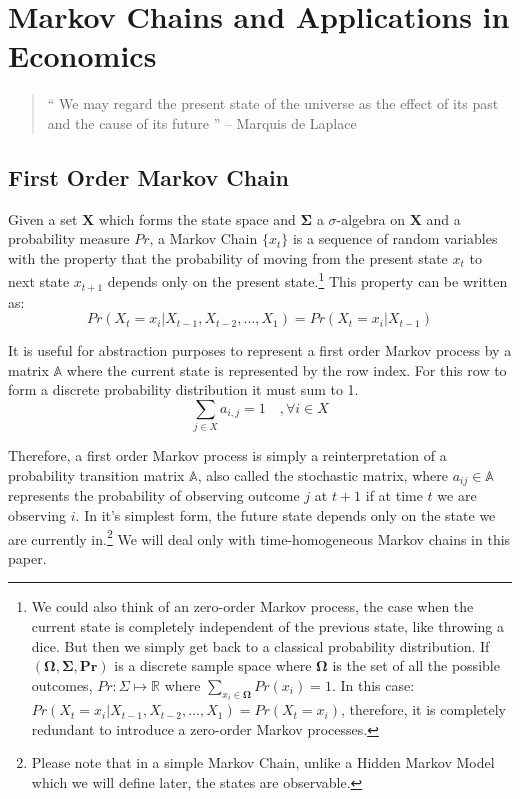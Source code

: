 \documentclass[a4paper,12pt]{article}
\theoremstyle{definition}
\begin{document}
\newpage
\section{Markov Chains and Applications in Economics}\label{smc}
\begin{quote}
“ We may regard the present state of the universe as the effect of its past and the cause of its future ” – Marquis de Laplace
\end{quote}
\subsection{First Order Markov Chain}
Given a set $\mathbf{X}$ which forms the state space  and $\mathbf{\Sigma}$ a $\sigma$-algebra on $\mathbf{X}$ and a probability measure $Pr$, a Markov Chain $\{x_t\}$ is a sequence of random variables with the property that the probability of moving from the present state $x_t$ to next state $x_{t+1}$ depends only on the present state.\footnote{We could also think of an zero-order Markov process, the case when the current state is completely independent of the previous state, like throwing a dice.  But then we simply get back to a classical probability distribution. If $\left(\mathbf{\Omega, \Sigma, Pr}\right)$ is a discrete sample space where $\mathbf{\Omega}$ is the set of all the possible outcomes, $Pr: \Sigma \mapsto \mathbb{R}$ where $\sum_{x_{i}\in\mathbf{\Omega}}{Pr(x_{i})} =1$. In this case: $Pr\left(X_t = x_i |X_{t-1},X_{t-2},...,X_{1}  \right) = Pr\left( X_t=x_i \right)$, therefore, it is completely redundant to introduce a zero-order Markov processes. 
}
This property can be written as:
\begin{equation}
Pr\left(X_t = x_i |X_{t-1},X_{t-2},...,X_{1}  \right) = Pr\left( X_t=x_i|X_{t-1} \right)
\end{equation}

It is useful for abstraction purposes to represent a first order Markov process by a  matrix $\mathbb{A}$ where the current state is represented by the row index. For this row to form a discrete probability distribution it must sum to 1. 
\begin{equation}
\sum_{j \in X} a_{i,j} =1 \quad , \forall i  \in X
\end{equation}

Therefore, a first order Markov process is simply a reinterpretation of a probability transition matrix $\mathbb{A}$, also called the stochastic matrix, where $a_{ij} \in \mathbb{A}$ represents the probability of observing outcome $j$ at $t+1$ if at time $t$ we are observing $i$. In it's simplest form, the future state depends only on the state we are currently in.\footnote{Please note that in a simple Markov Chain, unlike a Hidden Markov Model which we will define later, the states are observable.  } We will deal only with time-homogeneous Markov chains in this paper. 
\end{document}
